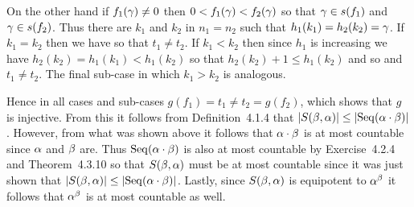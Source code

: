 {{    On the other hand if $f_1(\gamma) \neq 0$ then $0 < f_1(\gamma) < f_2(\gamma)$ so that $\gamma \in s(f_1)$ and $\gamma \in s(f_2)$.
    Thus there are $k_1$ and $k_2$ in $n_1 = n_2$ such that $h_1(k_1) = h_2(k_2) = \gamma$.
    If $k_1 = k_2$ then we have
    so that $t_1 \neq  t_2$.
    If $k_1 < k_2$ then since $h_1$ is increasing we have $h_2(k_2) = h_1(k_1) < h_1(k_2)$ so that $h_2(k_2) + 1 \leq h_1(k_2)$ and so
    and $t_1 \neq t_2$.
    The final sub-case in which $k_1 > k_2$ is analogous.
    
    Hence in all cases and sub-cases $g(f_1) = t_1 \neq t_2 = g(f_2)$, which shows that $g$ is injective.
    From this it follows from Definition~4.1.4 that $\left| S(\beta, \alpha) \right| \leq \left| \mathrm{Seq}(\alpha \cdot \beta) \right|$.
    However, from what was shown above it follows that $\alpha \cdot \beta$ is at most countable since $\alpha$ and $\beta$ are.
    Thus $\mathrm{Seq}(\alpha \cdot \beta)$ is also at most countable by Exercise~4.2.4 and Theorem~4.3.10 so that $S(\beta, \alpha)$ must be at most countable since it was just shown that $\left| S(\beta, \alpha) \right| \leq \left| \mathrm{Seq}(\alpha \cdot \beta) \right|$.
    Lastly, since $S(\beta, \alpha)$ is equipotent to $\alpha^\beta$ it follows that $\alpha^\beta$ is at most countable as well.
  }
}

